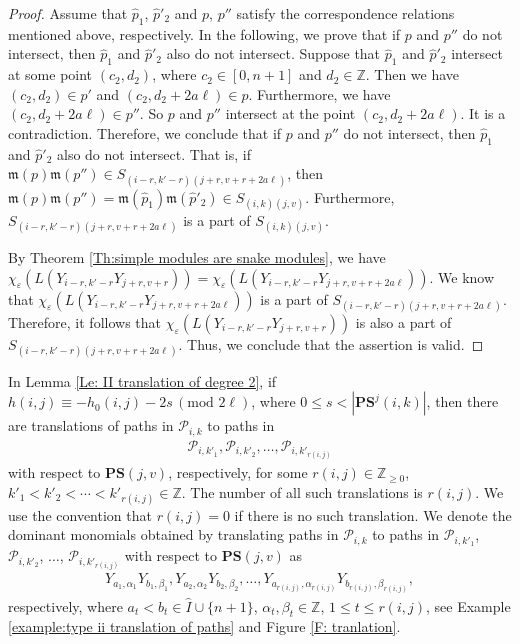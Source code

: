 \documentclass[12pt, reqno]{amsart}
\numberwithin{equation}{section}
\newcommand{\ZZ}{\mathbb{Z}}
\begin{document}
{\begin{proof}
Assume that $\hat{p}_1$, $\hat{p}'_2$ and $p$, $p''$ satisfy the correspondence relations mentioned above, respectively. In the following, we prove that if $p$ and $p''$ do not intersect, then $\hat{p}_1$ and $\hat{p}'_2$ also do not intersect. Suppose that $\hat{p}_1$ and $\hat{p}'_2$ intersect at some point $(c_2,d_2)$, where $c_2\in [0,n+1]$ and $d_2\in \ZZ$. Then we have $(c_2,d_2)\in p'$ and $(c_2,d_2+2a \ell)\in p$. Furthermore, we have $(c_2,d_2+2a \ell)\in p''$. So $p$ and $p''$ intersect at the point $(c_2,d_2+2a \ell)$. It is a contradiction. Therefore, we conclude that if $p$ and $p''$ do not intersect, then $\hat{p}_1$ and $\hat{p}'_2$ also do not intersect. That is, if $\mathfrak{m}(p)\mathfrak{m}(p'')\in S_{(i-r,k'-r)(j+r,v+r+2a \ell)}$, then $\mathfrak{m}(p)\mathfrak{m}(p'')= \mathfrak{m}(\hat{p}_1)\mathfrak{m}(\hat{p}'_2)\in S_{(i,k)(j,v)}$. Furthermore, $S_{(i-r,k'-r)(j+r,v+r+2a \ell)}$ is a part of $S_{(i,k)(j,v)}$.

By Theorem \ref{Th:simple modules are snake modules}, we have $\chi_\varepsilon(L(Y_{i-r,k'-r}Y_{j+r,v+r}))=\chi_\varepsilon(L(Y_{i-r,k'-r}Y_{j+r,v+r+2a \ell}))$. We know that $\chi_\varepsilon(L(Y_{i-r,k'-r}Y_{j+r,v+r+2a \ell}))$ is a part of $S_{(i-r,k'-r)(j+r,v+r+2a \ell)}$. Therefore, it follows that $\chi_\varepsilon(L(Y_{i-r,k'-r}Y_{j+r,v+r}))$ is also a part of $S_{(i-r,k'-r)(j+r,v+r+2a \ell)}$. Thus, we conclude that the assertion is valid.
\end{proof}





In Lemma \ref{Le: II translation of degree 2}, if $h(i,j)\equiv -h_{0}(i,j)-2s\,(\text{mod } 2 \ell)$, where $0\leq s<|\mathbf{PS}^{j}(i,k)|$, then there are translations of paths in $\mathscr{P}_{i,k}$ to paths in
\begin{align} \label{eq:def of rij}
\mathscr{P}_{i,k'_1}, \mathscr{P}_{i,k'_2}, \ldots, \mathscr{P}_{i,k'_{r(i,j)}}
\end{align}
with respect to $\mathbf{PS}(j,v)$, respectively, for some $r(i,j) \in \ZZ_{\ge 0}$, $k'_1<k'_2<\cdots<k'_{r(i,j)} \in \ZZ$. The number of all such translations is $r(i,j)$. We use the convention that $r(i,j)=0$ if there is no such translation. We denote the dominant monomials obtained by translating paths in $\mathscr{P}_{i,k}$ to paths in $\mathscr{P}_{i,k'_1}$, $\mathscr{P}_{i,k'_2}$, $\ldots$, $\mathscr{P}_{i,k'_{r(i,j)}}$ with respect to $\mathbf{PS}(j,v)$ as
\begin{align}\label{Eq:a_tb_t}
Y_{a_1,\alpha_1}Y_{b_1,\beta_1}, Y_{a_2,\alpha_2}Y_{b_2,\beta_2}, \ldots, Y_{a_{r(i,j)},\alpha_{r(i,j)}}Y_{b_{r(i,j)},\beta_{r(i,j)}},
\end{align}
respectively, where $a_{t}<b_{t}\in \hat{I}\cup \{n+1\}$, $\alpha_t, \beta_t \in \mathbb{Z}$, $1\leq t\leq r(i,j)$, see Example \ref{example:type ii translation of paths} and Figure \ref{F: tranlation}.

}
\end{document}

